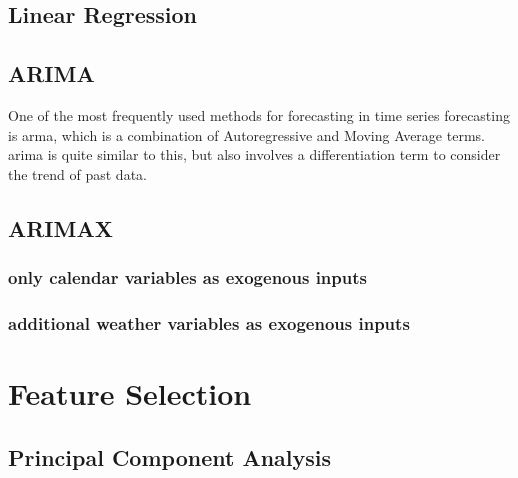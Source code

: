 \subsection{Linear Regression}


\subsection{ARIMA}

One of the most frequently used methods for forecasting in time series forecasting is \gls{arma}, which is a combination of Autoregressive and Moving Average terms. \gls{arima} is quite similar to this, but also involves a differentiation term to consider the trend of past data.\\

\subsection{ARIMAX}

\subsubsection{only calendar variables as exogenous inputs}

\subsubsection{additional weather variables as exogenous inputs}

\section{Feature Selection}

\subsection{Principal Component Analysis}






%
%
%

